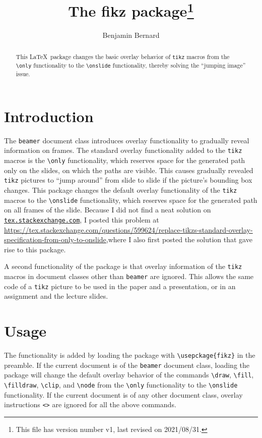 \documentclass{article}
\title{\vspace{-7mm}The \textsf{fikz} package\footnote{This file has version number v1, last revised on 2021/08/31.}}
\author{Benjamin Bernard}
\begin{document}
\maketitle

\vspace{-1mm}
\begin{abstract}
This \LaTeX\ package changes the basic overlay behavior of \verb|tikz| macros from the \verb|\only| functionality to the \verb|\onslide| functionality, thereby solving the ``jumping image'' issue.
\end{abstract}

\section{Introduction}

The \verb|beamer| document class introduces overlay functionality to gradually reveal information on frames. The standard overlay functionality added to the \verb|tikz| macros is the \verb|\only| functionality, which reserves space for the generated path only on the slides, on which the paths are visible. This causes gradually revealed \verb|tikz| pictures to ``jump around'' from slide to slide if the picture's bounding box changes. This package changes the default overlay functionality of the \verb|tikz| macros to the \verb|\onslide| functionality, which reserves space for the generated path on all frames of the slide. Because I did not find a neat solution on \href{https://tex.stackexchange.com}{\texttt{tex.stackexchange.com}}, I posted this problem at \url{https://tex.stackexchange.com/questions/599624/replace-tikzs-standard-overlay-specification-from-only-to-onslide},\linebreak where I also first posted the solution that gave rise to this package.


A second functionality of the package is that overlay information of the \verb|tikz| macros in document classes other than \verb|beamer| are ignored. This allows the same code of a \verb|tikz| picture to be used in the paper and a presentation, or in an assignment and the lecture slides.

\section{Usage}

The functionality is added by loading the package with \verb|\usepckage{fikz}| in the preamble. If the current document is of the \verb|beamer| document class, loading the package will change the default overlay behavior of the commands \verb|\draw|, \verb|\fill|, \verb|\filldraw|, \verb|\clip|, and \verb|\node| from the \verb|\only| functionality to the \verb|\onslide| functionality. If the current document is of any other document class, overlay instructions \verb|<>| are ignored for all the above commands.
\end{document}
